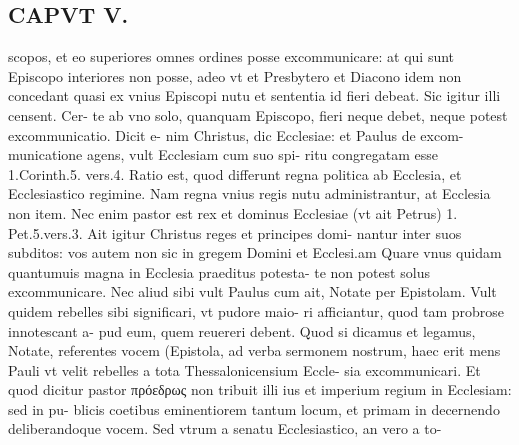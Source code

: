 \documentclass{article}
\begin{document}
\begin{pages}
\section*{CAPVT V. }
\marginpar{[ p.393 ]}\pstart scopos, et eo superiores omnes ordines posse excommunicare: at qui sunt Episcopo interiores non posse, adeo vt et Presbytero et Diacono idem non concedant quasi ex vnius Episcopi nutu et sententia id fieri debeat. Sic igitur illi censent. Cer- te ab vno solo, quanquam Episcopo, fieri neque debet, neque potest excommunicatio. Dicit e- nim Christus, dic Ecclesiae: et Paulus de excom- municatione agens, vult Ecclesiam cum suo spi- ritu congregatam esse 1.Corinth.5. vers.4. Ratio est, quod differunt regna politica ab Ecclesia, et Ecclesiastico regimine. Nam regna vnius regis nutu administrantur, at Ecclesia non item. Nec enim pastor est rex et dominus Ecclesiae (vt ait Petrus) 1. Pet.5.vers.3. Ait igitur Christus reges et principes domi- nantur inter suos subditos: vos autem non sic in gregem Domini et Ecclesi.am Quare vnus quidam quantumuis magna in Ecclesia praeditus potesta- te non potest solus excommunicare. Nec aliud sibi vult Paulus cum ait, Notate per Epistolam. Vult quidem rebelles sibi significari, vt pudore maio- ri afficiantur, quod tam probrose innotescant a- pud eum, quem reuereri debent. Quod si dicamus et legamus, Notate, referentes vocem (Epistola, ad verba sermonem nostrum, haec erit mens Pauli vt velit rebelles a tota Thessalonicensium Eccle- sia excommunicari. Et quod dicitur pastor πρόεδρως non tribuit illi ius et imperium regium in Ecclesiam: sed in pu- blicis coetibus eminentiorem tantum locum, et primam in decernendo deliberandoque vocem. Sed vtrum a senatu Ecclesiastico, an vero a to-  \pend

\end{pages}
\end{document}
